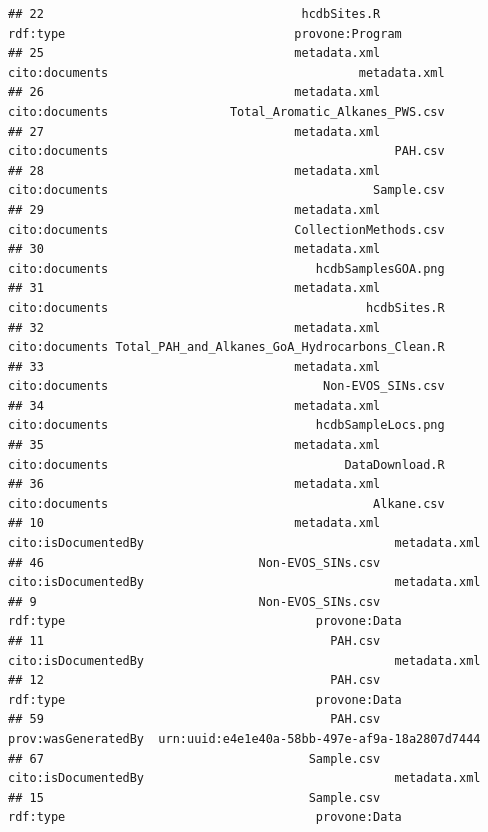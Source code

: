 \documentclass[]{article}
\begin{document}
\begin{verbatim}
## 22                                    hcdbSites.R                  rdf:type                                provone:Program
## 25                                   metadata.xml            cito:documents                                   metadata.xml
## 26                                   metadata.xml            cito:documents                 Total_Aromatic_Alkanes_PWS.csv
## 27                                   metadata.xml            cito:documents                                        PAH.csv
## 28                                   metadata.xml            cito:documents                                     Sample.csv
## 29                                   metadata.xml            cito:documents                          CollectionMethods.csv
## 30                                   metadata.xml            cito:documents                             hcdbSamplesGOA.png
## 31                                   metadata.xml            cito:documents                                    hcdbSites.R
## 32                                   metadata.xml            cito:documents Total_PAH_and_Alkanes_GoA_Hydrocarbons_Clean.R
## 33                                   metadata.xml            cito:documents                              Non-EVOS_SINs.csv
## 34                                   metadata.xml            cito:documents                             hcdbSampleLocs.png
## 35                                   metadata.xml            cito:documents                                 DataDownload.R
## 36                                   metadata.xml            cito:documents                                     Alkane.csv
## 10                                   metadata.xml       cito:isDocumentedBy                                   metadata.xml
## 46                              Non-EVOS_SINs.csv       cito:isDocumentedBy                                   metadata.xml
## 9                               Non-EVOS_SINs.csv                  rdf:type                                   provone:Data
## 11                                        PAH.csv       cito:isDocumentedBy                                   metadata.xml
## 12                                        PAH.csv                  rdf:type                                   provone:Data
## 59                                        PAH.csv       prov:wasGeneratedBy  urn:uuid:e4e1e40a-58bb-497e-af9a-18a2807d7444
## 67                                     Sample.csv       cito:isDocumentedBy                                   metadata.xml
## 15                                     Sample.csv                  rdf:type                                   provone:Data

\end{verbatim}
\end{document}
